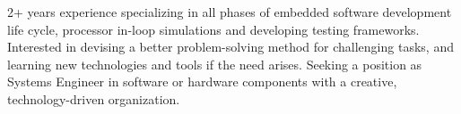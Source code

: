 
\begin{cvparagraph}
2+ years experience specializing in all phases of embedded software development life cycle, processor in-loop simulations and developing testing frameworks. Interested in devising a better problem-solving method for challenging tasks, and learning new technologies and tools if the need arises. Seeking a position as Systems Engineer in software or hardware components with a creative, technology-driven organization.
\end{cvparagraph}
